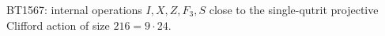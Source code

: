 \begin{center}\small
BT1567: internal operations $I,X,Z,F_3,S$ close to the single-qutrit projective Clifford action of size $216=9\cdot24$.
\end{center}
